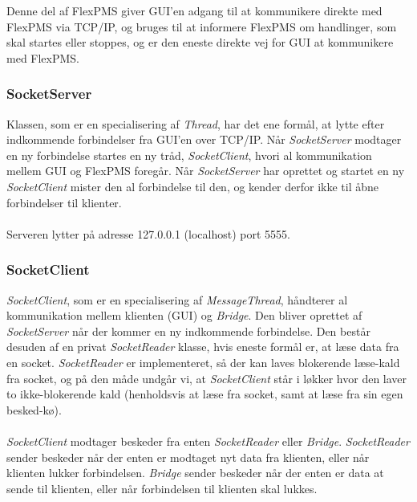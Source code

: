 Denne del af FlexPMS giver GUI'en adgang til at kommunikere direkte med FlexPMS via TCP/IP, og bruges til at informere FlexPMS om handlinger, som skal startes eller stoppes, og er den eneste direkte vej for GUI at kommunikere med FlexPMS.




\subsubsection{SocketServer}
Klassen, som er en specialisering af \textit{Thread}, har det ene formål, at lytte efter indkommende forbindelser fra GUI’en over TCP/IP. Når \textit{SocketServer} modtager en ny forbindelse startes en ny tråd, \textit{SocketClient}, hvori al kommunikation mellem GUI og FlexPMS foregår. Når \textit{SocketServer} har oprettet og startet en ny \textit{SocketClient} mister den al forbindelse til den, og kender derfor ikke til åbne forbindelser til klienter.\\\\

Serveren lytter på adresse 127.0.0.1 (localhost) port 5555.



\subsubsection{SocketClient}

\textit{SocketClient}, som er en specialisering af \textit{MessageThread}, håndterer al kommunikation mellem klienten (GUI) og \textit{Bridge}. Den bliver oprettet af \textit{SocketServer} når der kommer en ny indkommende forbindelse. Den består desuden af en privat \textit{SocketReader} klasse, hvis eneste formål er, at læse data fra en socket. \textit{SocketReader} er implementeret, så der kan laves blokerende læse-kald fra socket, og på den måde undgår vi, at \textit{SocketClient} står i løkker hvor den laver to ikke-blokerende kald (henholdsvis at læse fra socket, samt at læse fra sin egen besked-kø).\\\\

\textit{SocketClient} modtager beskeder fra enten \textit{SocketReader} eller \textit{Bridge}. \textit{SocketReader} sender beskeder når der enten er modtaget nyt data fra klienten, eller når klienten lukker forbindelsen. \textit{Bridge} sender beskeder når der enten er data at sende til klienten, eller når forbindelsen til klienten skal lukkes.\\\\

